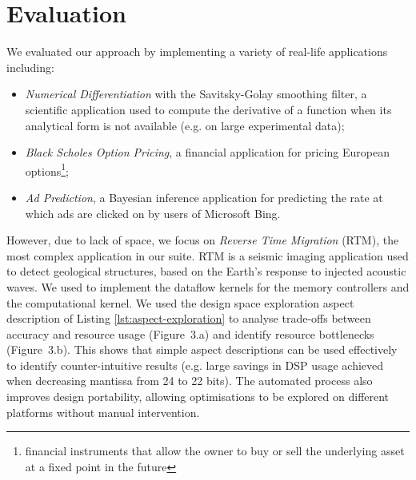 \section{Evaluation}
\label{sec:evaluation}
\label{sec:benchmark}

We evaluated our approach by implementing a variety of real-life
applications including:
\begin{itemize}
\item \emph{Numerical Differentiation} with the Savitsky-Golay
  smoothing filter, a scientific application used to compute the
  derivative of a function when its analytical form is not available
  (e.g. on large experimental data);
\item \emph{Black Scholes Option
  Pricing}, a financial application for pricing European
options\footnote{financial instruments that allow the owner to buy or
  sell the underlying asset at a fixed point in the future};
\item \emph{Ad Prediction}, a Bayesian inference application for
predicting the rate at which ads are clicked on by users of Microsoft
Bing.
\end{itemize}
However, due to lack of space, we focus on \emph{Reverse Time
  Migration} (RTM), the most complex application in our suite. RTM is
a seismic imaging application used to detect geological structures,
based on the Earth's response to injected acoustic waves. We used
\FAST{} to implement the dataflow kernels for the memory controllers
and the computational kernel. We used the design space exploration
aspect description of Listing \ref{lst:aspect-exploration} to analyse
trade-offs between accuracy and resource usage (Figure~3.a) and
identify resource bottlenecks (Figure~3.b). This shows that simple
aspect descriptions can be used effectively to identify
counter-intuitive results (e.g. large savings in DSP usage achieved
when decreasing mantissa from 24 to 22 bits). The automated process
also improves design portability, allowing optimisations to be
explored on different platforms without manual intervention.

